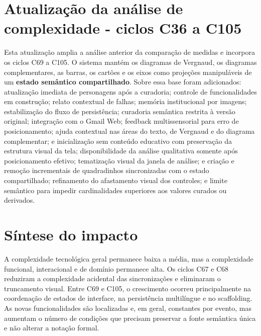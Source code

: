\documentclass[12pt,a4paper]{article}
\begin{document}
\section*{Atualização da análise de complexidade - ciclos C36 a C105}

Esta atualização amplia a análise anterior da comparação de medidas e incorpora os ciclos C69 a C105. O sistema mantém os diagramas de Vergnaud, os diagramas complementares, as barras, os cartões e os eixos como projeções manipuláveis de um \textbf{estado semântico compartilhado}. Sobre essa base foram adicionados: atualização imediata de personagens após a curadoria; controle de funcionalidades em construção; relato contextual de falhas; memória institucional por imagens; estabilização do fluxo de persistência; curadoria semântica restrita à versão original; integração com o Gmail Web; feedback multissensorial para erro de posicionamento; ajuda contextual nas áreas do texto, de Vergnaud e do diagrama complementar; e inicialização sem conteúdo educativo com preservação da estrutura visual da tela; disponibilidade da análise qualitativa somente após posicionamento efetivo; tematização visual da janela de análise; e criação e remoção incrementais de quadradinhos sincronizadas com o estado compartilhado; refinamento do afastamento visual dos controles; e limite semântico para impedir cardinalidades superiores aos valores curados ou derivados.

\section{Síntese do impacto}

A complexidade tecnológica geral permanece baixa a média, mas a complexidade funcional, interacional e de domínio permanece alta. Os ciclos C67 e C68 reduziram a complexidade acidental das sincronizações e eliminaram o truncamento visual. Entre C69 e C105, o crescimento ocorreu principalmente na coordenação de estados de interface, na persistência multilíngue e no scaffolding. As novas funcionalidades são localizadas e, em geral, constantes por evento, mas aumentam o número de condições que precisam preservar a fonte semântica única e não alterar a notação formal.
\end{document}
